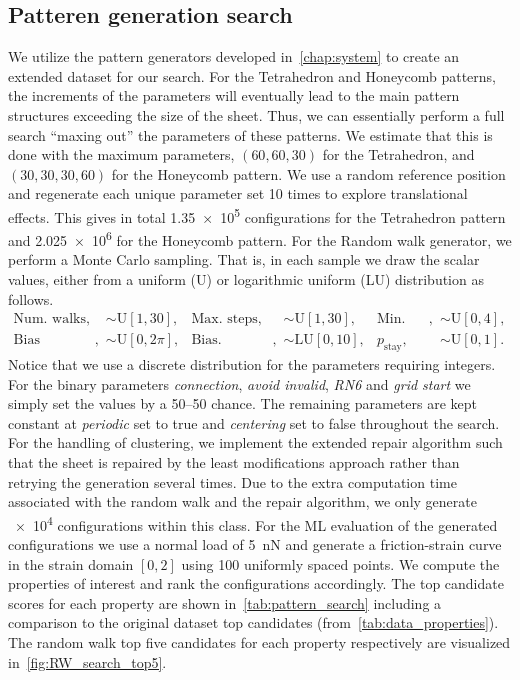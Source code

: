 \subsection{Patteren generation search}\label{sec:gen_search}
We utilize the pattern generators developed in~\cref{chap:system} to create an
extended dataset for our search. For the Tetrahedron and Honeycomb patterns, the
increments of the parameters will eventually lead to the main pattern structures
exceeding the size of the sheet. Thus, we can essentially perform a full search
``maxing out'' the parameters of these patterns. We estimate that this is done
with the maximum parameters, $(60, 60, 30)$ for the Tetrahedron, and $(30, 30, 30,
60)$ for the Honeycomb pattern. We use a random reference position and
regenerate each unique parameter set 10 times to explore translational effects. This
gives in total \num{1.35e5} configurations for the Tetrahedron pattern and
\num{2.025e6} for the Honeycomb pattern. For the Random walk generator, we perform a
Monte Carlo sampling. That is, in each sample we draw the scalar values, either from a
uniform (U) or logarithmic uniform (LU) distribution as follows.
\begin{align*}
  \text{Num.\ walks}, & \sim \text{U}[1, 30], & \text{Max.\ steps}, &\sim \text{U}[1,30], & \text{Min.\ dis.}, & \sim \text{U}[0,4], \\
  \text{Bias direction}, &\sim \text{U}[0, 2\pi], & \text{Bias.\ strength}, &\sim \text{LU}[0,10],  & p_{\text{stay}}, &\sim \text{U}[0,1].
\end{align*}
Notice that we use a discrete distribution for the parameters requiring
integers. For the binary parameters \textit{connection}, \textit{avoid invalid},
\textit{RN6} and \textit{grid start} we simply set the values by a 50--50
chance. The remaining parameters are kept constant at \textit{periodic} set to
true and \textit{centering} set to false throughout the search. For the handling
of clustering, we implement the extended repair algorithm such that the sheet is repaired by the least modifications approach rather than retrying the generation several times. Due to the extra
computation time associated with the random walk and the repair algorithm, we
only generate \num{e4} configurations within this class. For the \acrshort{ML}
evaluation of the generated configurations we use a normal load of \SI{5}{nN} and generate
a friction-strain curve in the strain domain $[0,2]$ using 100 uniformly spaced points. We compute
the properties of interest and rank the configurations accordingly. The top
candidate scores for each property are shown in~\cref{tab:pattern_search} including a comparison to the original dataset top candidates (from~\cref{tab:data_properties}). The random walk top five candidates for each property respectively are visualized in~\cref{fig:RW_search_top5}.


